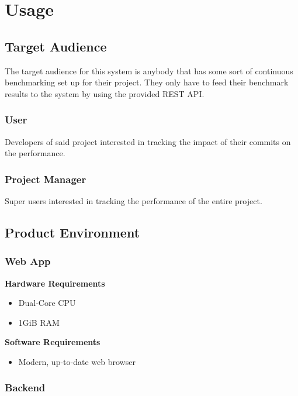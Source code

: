 \section{Usage}

\subsection{Target Audience}

The target audience for this system is anybody that has some sort of continuous benchmarking set up for their project. They only have to feed their \glspl{benchmark result} to the system by using the provided \gls{REST API}.

\subsubsection*{User}

Developers of said project interested in tracking the impact of their commits on the performance.

\subsubsection*{Project Manager}

Super users interested in tracking the performance of the entire project.

\subsection{Product Environment}

\subsubsection*{Web App}

\textbf{Hardware Requirements}
\begin{itemize}
    \item Dual-Core CPU
    \item 1GiB RAM
\end{itemize}

\textbf{Software Requirements}
\begin{itemize}
    \item Modern, up-to-date web browser
\end{itemize}

\subsubsection*{Backend}

